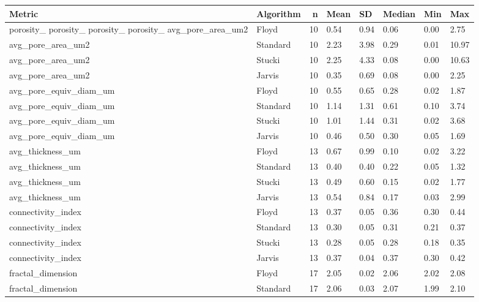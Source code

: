\begin{tabular}{llrlllll}
\toprule
Metric & Algorithm & n & Mean & SD & Median & Min & Max \\
\midrule
porosity_%
porosity_%
porosity_%
porosity_%
avg_pore_area_um2 & Floyd & 10 & 0.54 & 0.94 & 0.06 & 0.00 & 2.75 \\
avg_pore_area_um2 & Standard & 10 & 2.23 & 3.98 & 0.29 & 0.01 & 10.97 \\
avg_pore_area_um2 & Stucki & 10 & 2.25 & 4.33 & 0.08 & 0.00 & 10.63 \\
avg_pore_area_um2 & Jarvis & 10 & 0.35 & 0.69 & 0.08 & 0.00 & 2.25 \\
avg_pore_equiv_diam_um & Floyd & 10 & 0.55 & 0.65 & 0.28 & 0.02 & 1.87 \\
avg_pore_equiv_diam_um & Standard & 10 & 1.14 & 1.31 & 0.61 & 0.10 & 3.74 \\
avg_pore_equiv_diam_um & Stucki & 10 & 1.01 & 1.44 & 0.31 & 0.02 & 3.68 \\
avg_pore_equiv_diam_um & Jarvis & 10 & 0.46 & 0.50 & 0.30 & 0.05 & 1.69 \\
avg_thickness_um & Floyd & 13 & 0.67 & 0.99 & 0.10 & 0.02 & 3.22 \\
avg_thickness_um & Standard & 13 & 0.40 & 0.40 & 0.22 & 0.05 & 1.32 \\
avg_thickness_um & Stucki & 13 & 0.49 & 0.60 & 0.15 & 0.02 & 1.77 \\
avg_thickness_um & Jarvis & 13 & 0.54 & 0.84 & 0.17 & 0.03 & 2.99 \\
connectivity_index & Floyd & 13 & 0.37 & 0.05 & 0.36 & 0.30 & 0.44 \\
connectivity_index & Standard & 13 & 0.30 & 0.05 & 0.31 & 0.21 & 0.37 \\
connectivity_index & Stucki & 13 & 0.28 & 0.05 & 0.28 & 0.18 & 0.35 \\
connectivity_index & Jarvis & 13 & 0.37 & 0.04 & 0.37 & 0.30 & 0.42 \\
fractal_dimension & Floyd & 17 & 2.05 & 0.02 & 2.06 & 2.02 & 2.08 \\
fractal_dimension & Standard & 17 & 2.06 & 0.03 & 2.07 & 1.99 & 2.10 \\

\end{tabular}
